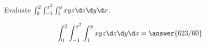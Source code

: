 \documentclass{ximera}
\author{David Guichard \and Neal Koblitz \and H. Jerome Keisler \and Albert Scheller \and Barry Balof \and Mike Wills \and Matthew Carr}
\begin{document}
\begin{exercise}





Evaluate  $\int_{0}^{2}\int_{-1}^{x^2}\int_{1}^{y}xyz\d z\d y\d x$.

\begin{prompt}
\[
\int_{0}^{2}\int_{-1}^{x^2}\int_{1}^{y}xyz\d z\d y\d x=\answer{623/60}
\]
\end{prompt}



\end{exercise}
\end{document}
